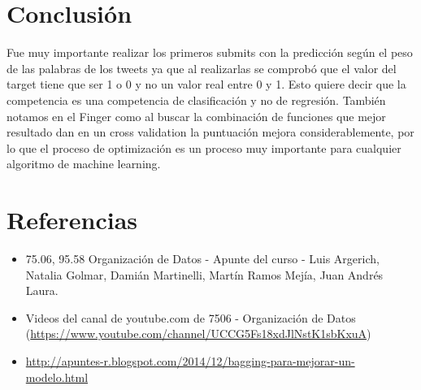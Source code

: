 \documentclass[12pt]{article}
\begin{document}
\section{Conclusión}
Fue muy importante realizar los primeros submits con la predicción según el peso de las palabras de los tweets ya que al realizarlas se comprobó que el valor del target tiene que ser 1 o 0 y no un valor real entre 0 y 1. Esto quiere decir que la competencia es una competencia de clasificación y no de regresión.
También notamos en el Finger como al buscar la combinación de funciones que mejor resultado dan en un cross validation la puntuación mejora considerablemente, por lo que el proceso de optimización es un proceso muy importante para cualquier algoritmo de machine learning.



\newpage
\section{Referencias}
\begin{itemize}
  \item 75.06, 95.58 Organización de Datos - Apunte del curso - Luis Argerich, Natalia Golmar, Damián Martinelli, Martín Ramos Mejía, Juan Andrés Laura.
  \item Videos del canal de youtube.com de 7506 - Organización de Datos (\url{https://www.youtube.com/channel/UCCG5Fs18xdJlNstK1sbKxuA})
  \item \url{http://apuntes-r.blogspot.com/2014/12/bagging-para-mejorar-un-modelo.html}
\end{itemize}
\end{document}
